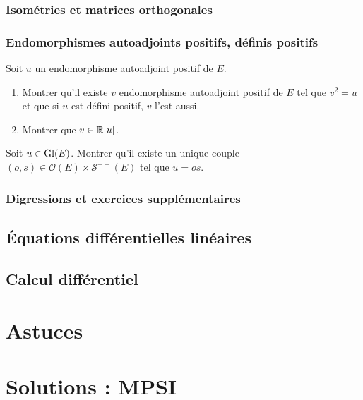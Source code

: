 \documentclass[12pt,a4paper]{exo_book}
\begin{document}
\section{Isométries et matrices orthogonales}

\section{Endomorphismes autoadjoints positifs, définis positifs}

\begin{exo}
    Soit $u$ un endomorphisme autoadjoint positif de $E$.
    \begin{enumerate}
        \item Montrer qu'il existe $v$ endomorphisme autoadjoint positif de $E$ tel que $v^2 = u$ et que si $u$ est défini positif, $v$ l'est aussi.
        \item Montrer que $v \in \mathbb{R} [u]$.
    \end{enumerate}
\end{exo}

\begin{exo}
    Soit $u \in \operatorname{Gl} (E)$. Montrer qu'il existe un unique couple $(o, s) \in \mathcal{O}(E) \times \mathcal{S}^{++} (E)$ tel que $u=os$.
\end{exo}

\section{Digressions et exercices supplémentaires}

\chapter{Équations différentielles linéaires}

\chapter{Calcul différentiel}




\part{Astuces}


\part{Solutions : MPSI}
\end{document}
